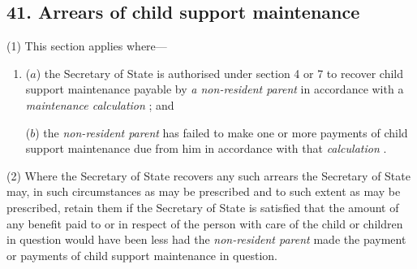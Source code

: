 \documentclass[12pt,a4paper]{article}
\begin{document}
\subsection{41. Arrears of child support maintenance}

(1) This section applies where—
\begin{enumerate}\item[]
($a$) the 
Secretary of State  %
is authorised under section 4
or 7 to recover child support maintenance payable by 
\emph{a non-resident parent}  %
in accordance with a 
\emph{maintenance calculation}%
; and

($b$) the 
\emph{non-resident parent}  %
has failed to make one or more payments of child support maintenance due from him in accordance with that 
\emph{calculation}%
.
\end{enumerate}


(2) Where the 
Secretary of State  %
recovers any such arrears 
the Secretary of State  %
may, in such circumstances as may be prescribed and to such extent as may be prescribed, retain them if 
the Secretary of State  %
is satisfied that the amount of any benefit paid to or in respect of the person with care of the child or children in question would have been less had the 
\emph{non-resident parent}  %
made the payment or payments of child support maintenance in question.
\end{document}
